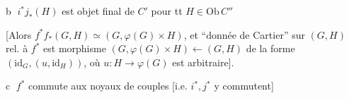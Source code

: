 \textcircled{b} $i^*j_*(H)$ est objet final de $C'$ pour tt $H\in\mathrm{Ob}\,C''$

[Alors $f^*f_*(G,H)\simeq(G,\varphi(G)\times H)$, et  ``donnée de Cartier'' sur $(G,H)$ rel. à $f^*$ est  morphisme $(G,\varphi(G)\times H)\leftarrow(G,H)$ de la forme $(\mathrm{id}_G,(u,\mathrm{id}_H))$, où $u:H\to\varphi(G)$ est arbitraire].


\textcircled{c}  $f^*$ commute aux noyaux de couples [i.e. $i^*,j^*$ y commutent]

